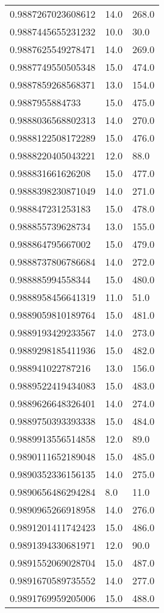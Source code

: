 \begin{center}
\begin{supertabular}[H]{p{0.30\textwidth}p{0.05\textwidth}p{0.05\textwidth}}
0.9887267023608612 & 14.0 & 268.0 \\ 
0.9887445655231232 & 10.0 & 30.0 \\ 
0.9887625549278471 & 14.0 & 269.0 \\ 
0.9887749550505348 & 15.0 & 474.0 \\ 
0.9887859268568371 & 13.0 & 154.0 \\ 
0.9887955884733 & 15.0 & 475.0 \\ 
0.9888036568802313 & 14.0 & 270.0 \\ 
0.9888122508172289 & 15.0 & 476.0 \\ 
0.9888220405043221 & 12.0 & 88.0 \\ 
0.988831661626208 & 15.0 & 477.0 \\ 
0.9888398230871049 & 14.0 & 271.0 \\ 
0.988847231253183 & 15.0 & 478.0 \\ 
0.988855739628734 & 13.0 & 155.0 \\ 
0.988864795667002 & 15.0 & 479.0 \\ 
0.9888737806786684 & 14.0 & 272.0 \\ 
0.988885994558344 & 15.0 & 480.0 \\ 
0.9888958456641319 & 11.0 & 51.0 \\ 
0.9889059810189764 & 15.0 & 481.0 \\ 
0.9889193429233567 & 14.0 & 273.0 \\ 
0.9889298185411936 & 15.0 & 482.0 \\ 
0.988941022787216 & 13.0 & 156.0 \\ 
0.9889522419434083 & 15.0 & 483.0 \\ 
0.9889626648326401 & 14.0 & 274.0 \\ 
0.9889750393393338 & 15.0 & 484.0 \\ 
0.9889913556514858 & 12.0 & 89.0 \\ 
0.9890111652189048 & 15.0 & 485.0 \\ 
0.9890352336156135 & 14.0 & 275.0 \\ 
0.9890656486294284 & 8.0 & 11.0 \\ 
0.9890965266918958 & 14.0 & 276.0 \\ 
0.9891201411742423 & 15.0 & 486.0 \\ 
0.9891394330681971 & 12.0 & 90.0 \\ 
0.9891552069028704 & 15.0 & 487.0 \\ 
0.9891670589735552 & 14.0 & 277.0 \\ 
0.9891769959205006 & 15.0 & 488.0 \\ 

\end{supertabular}
\end{center}
